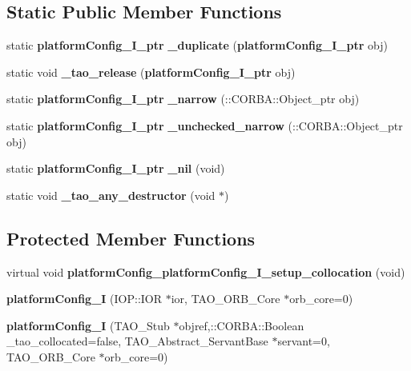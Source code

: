 \subsection*{Static Public Member Functions}
\begin{DoxyCompactItemize}
\item 
static {\bf platform\+Config\+\_\+\+I\+\_\+ptr} {\bfseries \+\_\+duplicate} ({\bf platform\+Config\+\_\+\+I\+\_\+ptr} obj)\label{classplatformConfig_1_1platformConfig__I_a49707a0c02d8dd402b79e773c6281a54}

\item 
static void {\bfseries \+\_\+tao\+\_\+release} ({\bf platform\+Config\+\_\+\+I\+\_\+ptr} obj)\label{classplatformConfig_1_1platformConfig__I_ae54c0dbf69fcbb6506e9cc7db46a707a}

\item 
static {\bf platform\+Config\+\_\+\+I\+\_\+ptr} {\bfseries \+\_\+narrow} (\+::C\+O\+R\+B\+A\+::\+Object\+\_\+ptr obj)\label{classplatformConfig_1_1platformConfig__I_a261756759d840c88ca131b398c7b6b63}

\item 
static {\bf platform\+Config\+\_\+\+I\+\_\+ptr} {\bfseries \+\_\+unchecked\+\_\+narrow} (\+::C\+O\+R\+B\+A\+::\+Object\+\_\+ptr obj)\label{classplatformConfig_1_1platformConfig__I_ae26b49552f2aa915c8343001e6450a13}

\item 
static {\bf platform\+Config\+\_\+\+I\+\_\+ptr} {\bfseries \+\_\+nil} (void)\label{classplatformConfig_1_1platformConfig__I_a26f2d1745c61830b8d14f5fc21d29d54}

\item 
static void {\bfseries \+\_\+tao\+\_\+any\+\_\+destructor} (void $\ast$)\label{classplatformConfig_1_1platformConfig__I_a4579a995640adaf155305ff9647447ac}

\end{DoxyCompactItemize}
\subsection*{Protected Member Functions}
\begin{DoxyCompactItemize}
\item 
virtual void {\bfseries platform\+Config\+\_\+platform\+Config\+\_\+\+I\+\_\+setup\+\_\+collocation} (void)\label{classplatformConfig_1_1platformConfig__I_adb4e122dfcbf20b7f42b506be9f23849}

\item 
{\bfseries platform\+Config\+\_\+I} (I\+O\+P\+::\+I\+OR $\ast$ior, T\+A\+O\+\_\+\+O\+R\+B\+\_\+\+Core $\ast$orb\+\_\+core=0)\label{classplatformConfig_1_1platformConfig__I_ac2165a40ea9559d80ce3caf05cfb87cd}

\item 
{\bfseries platform\+Config\+\_\+I} (T\+A\+O\+\_\+\+Stub $\ast$objref,\+::C\+O\+R\+B\+A\+::\+Boolean \+\_\+tao\+\_\+collocated=false, T\+A\+O\+\_\+\+Abstract\+\_\+\+Servant\+Base $\ast$servant=0, T\+A\+O\+\_\+\+O\+R\+B\+\_\+\+Core $\ast$orb\+\_\+core=0)\label{classplatformConfig_1_1platformConfig__I_ae0922dce5ed0eb53fcb1fd265bd36a31}

\end{DoxyCompactItemize}
